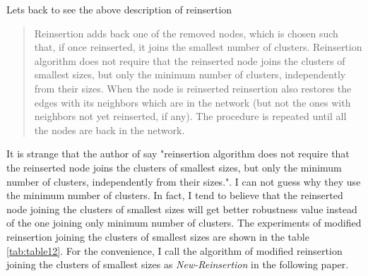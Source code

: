 \documentclass{article}
\newenvironment{itquote}
{\begin{quote}\itshape}
	{\end{quote}\ignorespacesafterend}
\begin{document}
	Let\textquotesingle s back to see the above description of reinsertion
	
	\begin{itquote}
	
	Reinsertion adds back one of the removed nodes, which is chosen such that, if once reinserted, it joins the smallest number of clusters. Reinsertion algorithm does not require that the reinserted node joins the clusters of smallest sizes, but only the minimum number of clusters, independently from their sizes. When the node is reinserted reinsertion also restores the edges with its neighbors which are in the network (but not the ones with neighbors not yet reinserted, if any). The procedure is repeated until all the nodes are back in the network. 
	
	\end{itquote}	
	
	 It is strange that the author of \cite{morone2015influence} \cite{morone2016collective} say "reinsertion algorithm does not require that the reinserted node joins the clusters of smallest sizes, but only the minimum number of clusters, independently from their sizes.". I can not guess why they use the minimum number of clusters. In fact, I tend to believe that the reinserted node joining the clusters of smallest sizes will get better robustness value instead of the one joining only minimum number of clusters. The experiments of modified reinsertion joining the clusters of smallest sizes are shown in the table \ref{tab:table12}. For the convenience, I call the algorithm of modified reinsertion joining the clusters of smallest sizes as \textit{New-Reinsertion} in the following paper.
	 
\end{document}
